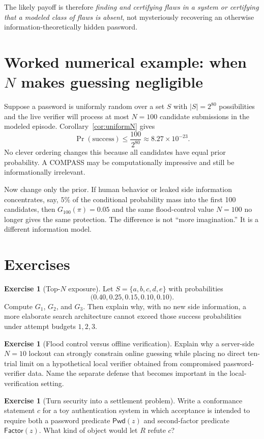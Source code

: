 \documentclass[11pt,openany]{book}
\theoremstyle{definition}
\newtheorem{exercise}[theorem]{Exercise}
\theoremstyle{remark}
\begin{document}
The likely payoff is therefore \emph{finding and certifying flaws in a system or certifying that a modeled class of flaws is absent}, not mysteriously recovering an otherwise information-theoretically hidden password.

\section{Worked numerical example: when \texorpdfstring{$N$}{N} makes guessing negligible}
Suppose a password is uniformly random over a set $S$ with $|S|=2^{80}$ possibilities and the live verifier will process at most $N=100$ candidate submissions in the modeled episode. Corollary~\ref{cor:uniformN} gives
\[
\Pr(\text{success})\le \frac{100}{2^{80}}\approx 8.27\times 10^{-23}.
\]
No clever ordering changes this because all candidates have equal prior probability. A COMPASS may be computationally impressive and still be informationally irrelevant.

Now change only the prior. If human behavior or leaked side information concentrates, say, $5\%$ of the conditional probability mass into the first 100 candidates, then $G_{100}(\pi)=0.05$ and the same flood-control value $N=100$ no longer gives the same protection. The difference is not ``more imagination.'' It is a different information model.

\section{Exercises}
\begin{exercise}[Top-$N$ exposure]\label{ex:passwordtopn}
Let $S=\{a,b,c,d,e\}$ with probabilities
\[
\bigl(0.40,0.25,0.15,0.10,0.10\bigr).
\]
Compute $G_1$, $G_2$, and $G_3$. Then explain why, with no new side information, a more elaborate search architecture cannot exceed those success probabilities under attempt budgets $1,2,3$.
\end{exercise}

\begin{exercise}[Flood control versus offline verification]\label{ex:passwordoffline}
Explain why a server-side $N=10$ lockout can strongly constrain online guessing while placing no direct ten-trial limit on a hypothetical local verifier obtained from compromised password-verifier data. Name the separate defense that becomes important in the local-verification setting.
\end{exercise}

\begin{exercise}[Turn security into a settlement problem]\label{ex:passwordconformance}
Write a conformance statement $c$ for a toy authentication system in which acceptance is intended to require both a password predicate $\mathsf{Pwd}(z)$ and second-factor predicate $\mathsf{Factor}(z)$. What kind of object would let $R$ refute $c$?
\end{exercise}
\end{document}
